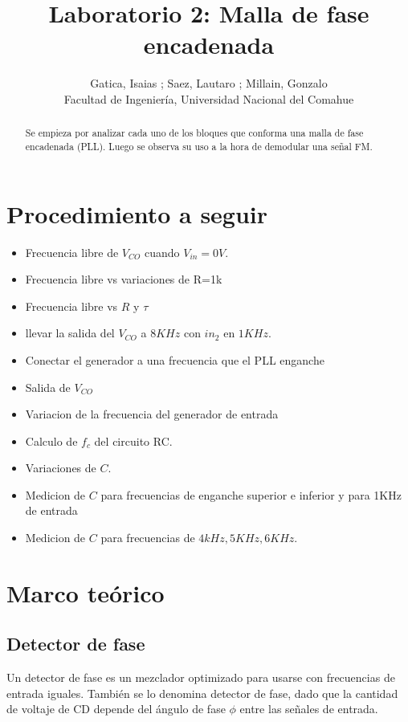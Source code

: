 \documentclass[10pt,a4paper]{IEEEtran}
\begin{document}
\title{Laboratorio 2: Malla de fase encadenada}
\author{Gatica, Isaias ; Saez, Lautaro ; Millain, Gonzalo\\
Facultad de Ingeniería, Universidad Nacional del Comahue\\}

\maketitle

\begin{abstract}
    Se empieza por analizar cada uno de los bloques que conforma una malla de fase encadenada (PLL). Luego se observa su uso a la hora de demodular una señal FM. 
\end{abstract}
\section{Procedimiento a seguir}
\begin{itemize}
	\item Frecuencia libre de $V_{CO}$ cuando $V_{in}=0V$.
	\item Frecuencia libre vs variaciones de R=1k %
	\item Frecuencia libre vs $R$ y $\tau$
	\item llevar la salida del $V_{CO}$ a $8KHz$ con $in_2$ en $1KHz$.
	\item Conectar el generador a una frecuencia que el PLL enganche %
	\item Salida de $V_{CO}$
	\item Variacion de la frecuencia del generador de entrada
	\item Calculo de $f_c$ del circuito RC.
	\item Variaciones de $C$.
	\item Medicion de $C$ para frecuencias de enganche superior e inferior y para 1KHz de entrada 
	\item Medicion de $C$ para frecuencias de $4kHz, 5KHz, 6KHz$.
\end{itemize}

    \section{Marco teórico}
    \subsection{Detector de fase}
    Un detector de fase es un mezclador optimizado para usarse con frecuencias de entrada iguales. También se lo denomina detector de fase, dado que la cantidad de voltaje de CD depende del ángulo de fase $\phi$ entre las señales de entrada.
    
\end{document}
